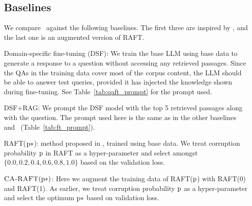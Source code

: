 \subsection{Baselines}
\label{sec:baselines}
We compare \ourmethodshort\ against the following baselines. The first three are inspired by \citeauthor{zhang2024raft}, and the last one is an augmented version of RAFT.
\begin{compactenum}[1)]
\item Domain-specific fine-tuning (DSF): We train the base LLM using base data to generate a response to a question without accessing any retrieved passages. 
Since the QAs in the training data cover most of the corpus content, the LLM should be able to answer test queries, provided it has injected the knowledge shown during fine-tuning. 
See Table~\ref{tab:qaft_prompt} for the prompt used.
\item DSF+RAG: We prompt the DSF model with the top 5 retrieved passages along with the question. 
The prompt used here is the same as in the other baselines and \ourmethodshort\ (Table~\ref{tab:ft_prompt}).
\item RAFT($\mathrm{p}*$): method proposed in \cite{zhang2024raft}, trained using base data. We treat corruption probability $\mathrm{p}$ in RAFT as a hyper-parameter and select amongst $\{0.0, 0.2, 0.4, 0.6, 0.8, 1.0\}$ based on the validation loss. 
\item $\textsc{CA-RAFT}(\mathrm{p}*)$: Here we augment the training data of RAFT($\mathrm{p}$) with RAFT(0) and RAFT(1). As earlier, we treat corruption probability $\mathrm{p}$ as a hyper-parameter and select the optimum $\mathrm{p}*$ based on validation loss. 
\end{compactenum}



